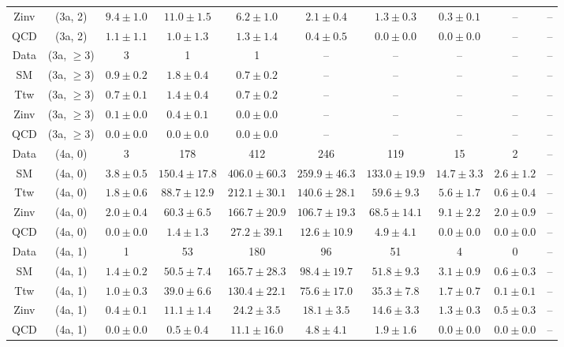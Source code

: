 \begin{table}[h!]
{\begin{tabular}{cccccccccc}
	Zinv & (3a, 2) & $9.4\pm 1.0$ & $11.0\pm 1.5$ & $6.2\pm 1.0$ & $2.1\pm 0.4$ & $1.3\pm 0.3$ & $0.3\pm 0.1$ & -- & -- \\[0.5ex] 
	QCD & (3a, 2) & $1.1\pm 1.1$ & $1.0\pm 1.3$ & $1.3\pm 1.4$ & $0.4\pm 0.5$ & $0.0\pm 0.0$ & $0.0\pm 0.0$ & -- & -- \\[0.5ex] 
	Data & (3a, $\ge3$) & 3 & 1 & 1 & -- & -- & -- & -- & -- \\[0.5ex] 
	SM & (3a, $\ge3$) & $0.9\pm 0.2$ & $1.8\pm 0.4$ & $0.7\pm 0.2$ & -- & -- & -- & -- & -- \\[0.5ex] 
	Ttw & (3a, $\ge3$) & $0.7\pm 0.1$ & $1.4\pm 0.4$ & $0.7\pm 0.2$ & -- & -- & -- & -- & -- \\[0.5ex] 
	Zinv & (3a, $\ge3$) & $0.1\pm 0.0$ & $0.4\pm 0.1$ & $0.0\pm 0.0$ & -- & -- & -- & -- & -- \\[0.5ex] 
	QCD & (3a, $\ge3$) & $0.0\pm 0.0$ & $0.0\pm 0.0$ & $0.0\pm 0.0$ & -- & -- & -- & -- & -- \\[0.5ex] 
	Data & (4a, 0) & 3 & 178 & 412 & 246 & 119 & 15 & 2 & -- \\[0.5ex] 
	SM & (4a, 0) & $3.8\pm 0.5$ & $150.4\pm 17.8$ & $406.0\pm 60.3$ & $259.9\pm 46.3$ & $133.0\pm 19.9$ & $14.7\pm 3.3$ & $2.6\pm 1.2$ & -- \\[0.5ex] 
	Ttw & (4a, 0) & $1.8\pm 0.6$ & $88.7\pm 12.9$ & $212.1\pm 30.1$ & $140.6\pm 28.1$ & $59.6\pm 9.3$ & $5.6\pm 1.7$ & $0.6\pm 0.4$ & -- \\[0.5ex] 
	Zinv & (4a, 0) & $2.0\pm 0.4$ & $60.3\pm 6.5$ & $166.7\pm 20.9$ & $106.7\pm 19.3$ & $68.5\pm 14.1$ & $9.1\pm 2.2$ & $2.0\pm 0.9$ & -- \\[0.5ex] 
	QCD & (4a, 0) & $0.0\pm 0.0$ & $1.4\pm 1.3$ & $27.2\pm 39.1$ & $12.6\pm 10.9$ & $4.9\pm 4.1$ & $0.0\pm 0.0$ & $0.0\pm 0.0$ & -- \\[0.5ex] 
	Data & (4a, 1) & 1 & 53 & 180 & 96 & 51 & 4 & 0 & -- \\[0.5ex] 
	SM & (4a, 1) & $1.4\pm 0.2$ & $50.5\pm 7.4$ & $165.7\pm 28.3$ & $98.4\pm 19.7$ & $51.8\pm 9.3$ & $3.1\pm 0.9$ & $0.6\pm 0.3$ & -- \\[0.5ex] 
	Ttw & (4a, 1) & $1.0\pm 0.3$ & $39.0\pm 6.6$ & $130.4\pm 22.1$ & $75.6\pm 17.0$ & $35.3\pm 7.8$ & $1.7\pm 0.7$ & $0.1\pm 0.1$ & -- \\[0.5ex] 
	Zinv & (4a, 1) & $0.4\pm 0.1$ & $11.1\pm 1.4$ & $24.2\pm 3.5$ & $18.1\pm 3.5$ & $14.6\pm 3.3$ & $1.3\pm 0.3$ & $0.5\pm 0.3$ & -- \\[0.5ex] 
	QCD & (4a, 1) & $0.0\pm 0.0$ & $0.5\pm 0.4$ & $11.1\pm 16.0$ & $4.8\pm 4.1$ & $1.9\pm 1.6$ & $0.0\pm 0.0$ & $0.0\pm 0.0$ & -- \\[0.5ex] 

\end{tabular}}
\end{table}

